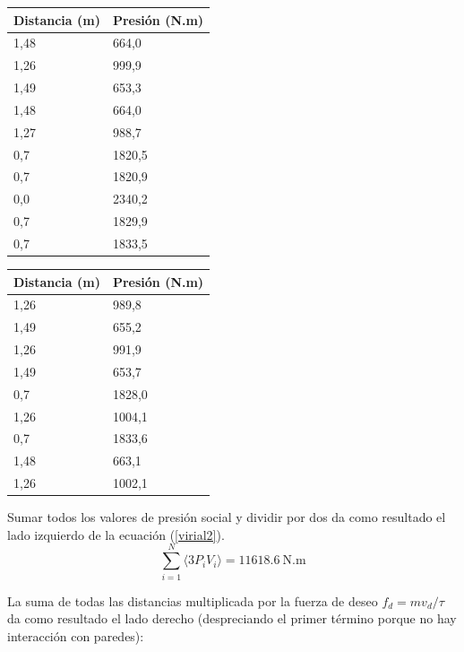 \begin{center}
\label{my-label}
\begin{tabular}{|l|l|}
\hline
Distancia (m) & Presión (N.m) \\ \hline
1,48          & 664,0       \\ \hline
1,26          & 999,9       \\ \hline
1,49          & 653,3       \\ \hline
1,48          & 664,0       \\ \hline
1,27          & 988,7       \\ \hline
0,7           & 1820,5       \\ \hline
0,7           & 1820,9       \\ \hline
0,0           & 2340,2       \\ \hline
0,7           & 1829,9       \\ \hline
0,7           & 1833,5       \\ \hline
\end{tabular}
\quad
\begin{tabular}{|l|l|}
\hline
Distancia (m) & Presión (N.m) \\ \hline
1,26          & 989,8       \\ \hline
1,49          & 655,2       \\ \hline
1,26          & 991,9       \\ \hline
1,49          & 653,7        \\ \hline
0,7           & 1828,0       \\ \hline
1,26          & 1004,1       \\ \hline
0,7           & 1833,6       \\ \hline
1,48          & 663,1       \\ \hline
1,26          & 1002,1       \\ \hline
\end{tabular}
\end{center}


Sumar todos los valores de presión social y dividir por dos da como resultado el lado izquierdo de la ecuación (\ref{virial2}).
\begin{equation}
 \displaystyle\sum_{i=1}^N\langle3P_iV_i\rangle = 11618.6\ \text{N.m}
\end{equation}

La suma de todas las distancias multiplicada por la fuerza de deseo $f_d=mv_d/\tau$ da como resultado el lado derecho (despreciando el primer término porque no hay interacción con paredes):

